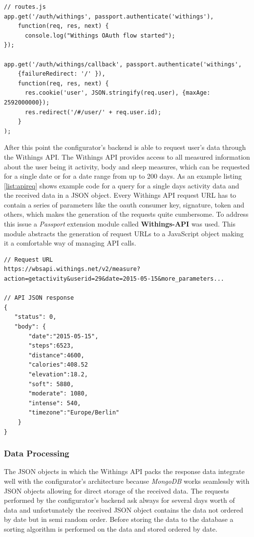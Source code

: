 \documentclass[../medieninformatik-arbeit.tex]{subfiles}
\begin{document}
\begin{lstlisting}[style=htmlcssjs, caption={Passport OAuth authentication implementation},label=list:auth]
// routes.js
app.get('/auth/withings', passport.authenticate('withings'),
    function(req, res, next) {
      console.log("Withings OAuth flow started");
});

app.get('/auth/withings/callback', passport.authenticate('withings',
	{failureRedirect: '/' }),
	function(req, res, next) {
	  res.cookie('user', JSON.stringify(req.user), {maxAge: 2592000000});
	  res.redirect('/#/user/' + req.user.id);
	}
);
\end{lstlisting}
After this point the configurator's backend is able to request user's data through the Withings API. The Withings API provides access to all measured information about the user being it activity, body and sleep measures, which can be requested for a single date or for a date range from up to 200 days. As an example listing \ref{list:apireq} shows example code for a query for a single days activity data and the received data in a JSON object. Every Withings API request URL has to contain a series of parameters like the oauth consumer key, signature, token and others, which makes the generation of the requests quite cumbersome. To address this issue a \textit{Passport} extension module called \textbf{Withings-API}\cite{withingsApi} was used. This module abstracts the generation of request URLs to a JavaScript object making it a comfortable way of managing API calls. 

\begin{lstlisting}[style=htmlcssjs, caption={Withings API query and response example},label=list:apireq,float=t]
// Request URL
https://wbsapi.withings.net/v2/measure?action=getactivity&userid=29&date=2015-05-15&more_parameters...

// API JSON response
{
   "status": 0,
   "body": {
       "date":"2015-05-15",
       "steps":6523,
       "distance":4600,
       "calories":408.52
       "elevation":18.2,
       "soft": 5880,
       "moderate": 1080,
       "intense": 540, 
       "timezone":"Europe/Berlin"
    }
}
\end{lstlisting}

\subsubsection{Data Processing}
The JSON objects in which the Withings API packs the response data integrate well with the configurator's architecture because \textit{MongoDB} works seamlessly with JSON objects allowing for direct storage of the received data. The requests performed by the configurator's backend ask always for several days worth of data and unfortunately the received JSON object contains the data not ordered by date but in semi random order. Before storing the data to the database a sorting algorithm is performed on the data and stored ordered by date. 
\end{document}
